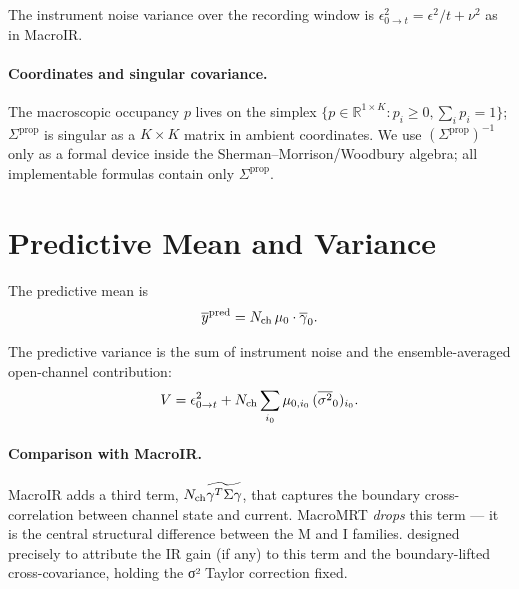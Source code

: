 \documentclass[11pt]{article}
\begin{document}
The instrument noise variance over the recording window is
$\epsilon^2_{0\to t}=\epsilon^2/t+\nu^2$ as in MacroIR.

\paragraph{Coordinates and singular covariance.}
The macroscopic occupancy $p$ lives on the simplex
$\{p\in\mathbb{R}^{1\times K}:p_i\ge 0,\sum_i p_i=1\}$; $\Sigma^{\mathrm{prop}}$ is
singular as a $K\times K$ matrix in ambient coordinates. We use
$(\Sigma^{\mathrm{prop}})^{-1}$ only as a formal device inside the
Sherman--Morrison/Woodbury algebra; all implementable formulas contain
only $\Sigma^{\mathrm{prop}}$.

\section{Predictive Mean and Variance}

The predictive mean is
\begin{equation}
  \overline{y}^{\mathrm{pred}}
  = N_{\mathrm{ch}}\,\mu_0\cdot\overline{\gamma}_0.
  \label{eq:ypred}
\end{equation}

The predictive variance is the sum of instrument noise and the
ensemble-averaged open-channel contribution:
\begin{equation}
  V
  = \epsilon^2_{0\to t}
  + N_{\mathrm{ch}}\sum_{i_0}\mu_{0,i_0}\,(\overline{\sigma^2}_0)_{i_0}.
  \label{eq:V}
\end{equation}

\paragraph{Comparison with MacroIR.}
MacroIR adds a third term, $N_{\mathrm{ch}}\widetilde{\gamma^{T}\Sigma\gamma}$,
that captures the boundary cross-correlation between channel state and
current. MacroMRT \emph{drops} this term --- it is the central structural
difference between the M and I families.
designed precisely to attribute the IR gain (if any) to this term and
the boundary-lifted cross-covariance, holding the σ² Taylor correction
fixed.
\end{document}
